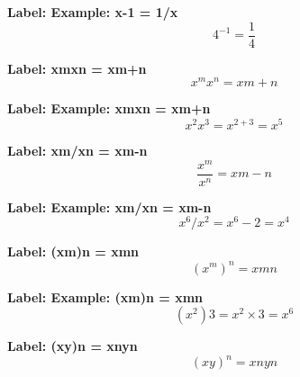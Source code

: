 \textbf{Label: Example: x-1 = 1/x}
\[4^{-1}=\frac{1}{4}\]

\textbf{Label: xmxn = xm+n}
\[x^{m}x^{n} = xm+n\]

\textbf{Label: Example: xmxn = xm+n}
\[x^{2}x^{3}=x^{2+3}=x^{5}\]

\textbf{Label: xm/xn = xm-n}
\[\frac{x^{m}}{x^{n}} = xm-n\]

\textbf{Label: Example: xm/xn = xm-n}
\[x^{6}/x^{2} = x^{6}-2 = x^{4}\]

\textbf{Label: (xm)n = xmn}
\[(x^{m})^{n} = xmn\]

\textbf{Label: Example: (xm)n = xmn}
\[(x^{2})3 = x^{2}\times 3 = x^{6}\]

\textbf{Label: (xy)n = xnyn}
\[(xy)^{n} = xnyn\]

